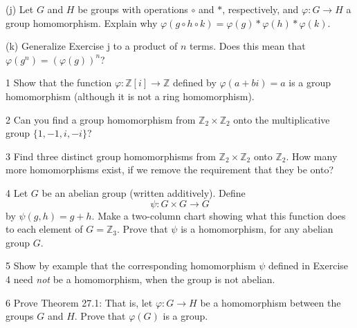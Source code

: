 \begin{problem}[Warmup]{(j)}
    Let $G$ and $H$ be groups with operations $\circ$ and $*$, respectively, and $\varphi : G \to H$ a group homomorphism. Explain why $\varphi(g \circ h \circ k) = \varphi(g) * \varphi(h) * \varphi(k)$.
\end{problem}
\unsolved

\begin{problem}[Warmup]{(k)}
    Generalize Exercise j to a product of $n$ terms. Does this mean that $\varphi(g^n) = {(\varphi(g))}^n$?
\end{problem}
\unsolved

\begin{problem}{1}
    Show that the function $\varphi : \mathbb{Z}[i] \to \mathbb{Z}$ defined by
    $\varphi(a + bi) = a$ is a group homomorphism (although it is not a ring
    homomorphism).
\end{problem}
\unsolved

\begin{problem}{2}
    Can you find a group homomorphism from $\mathbb{Z}_2 \times \mathbb{Z}_2$ onto the
    multiplicative group $\{1, -1, i, -i\}$?
\end{problem}
\unsolved

\begin{problem}{3}
    Find three distinct group homomorphisms from $\mathbb{Z}_2 \times \mathbb{Z}_2$ onto
    $\mathbb{Z}_2$. How many more homomorphisms exist, if we remove the requirement that
    they be onto?
\end{problem}
\unsolved

\begin{problem}{4}
    Let $G$ be an abelian group (written additively). Define
    \[\psi : G \times G \to G\]
    by $\psi(g, h) = g + h$. Make a two-column chart showing what this function does to
    each element of $G = \mathbb{Z}_3$. Prove that $\psi$ is a homomorphism, for any
    abelian group $G$.
\end{problem}
\unsolved

\begin{problem}{5}
    Show by example that the corresponding homomorphism $\psi$ defined in Exercise 4 need
    \emph{not} be a homomorphism, when the group is not abelian.
\end{problem}
\unsolved

\begin{problem}{6}
    Prove Theorem 27.1: That is, let $\varphi : G \to H$ be a homomorphism between the
    groups $G$ and $H$. Prove that $\varphi(G)$ is a group.
\end{problem}
\unsolved

